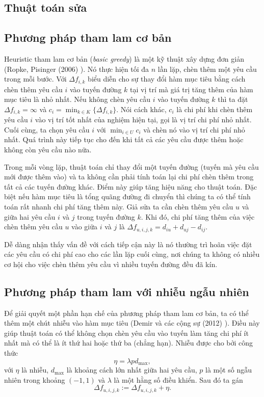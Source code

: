 \subsection{Thuật toán sửa}


\subsection{Phương pháp tham lam cơ bản}
\label{sec:basic_greedy}
Heuristic tham lam cơ bản (\textit{basic greedy}) là một kỹ thuật xây dựng đơn giản (Ropke, Pisinger (2006) \cite{ropke2006adaptive}). Nó thực hiện tối đa $n$ lần lặp, chèn thêm một yêu cầu trong mỗi bước. Với $\Delta f_{i, k}$ biểu diễn cho sự thay đổi hàm mục tiêu bằng cách chèn thêm yêu cầu $i$ vào tuyến đường $k$ tại vị trí mà giá trị tăng thêm của hàm mục tiêu là nhỏ nhất. Nếu không chèn yêu cầu $i$ vào tuyến đường $k$ thì ta đặt $\Delta f_{i, k} = \infty$ và $c_i = \min_{k \in K}\{\Delta f_{i, k}\}$. Nói cách khác, $c_i$ là chi phí khi chèn thêm yêu cầu $i$ vào vị trí tốt nhất của nghiệm hiện tại, gọi là vị trí chi phí nhỏ nhất. Cuối cùng, ta chọn yêu cầu $i$ với $\min_{i \in U} c_i$ và chèn nó vào vị trí chi phí nhỏ nhất. Quá trình này tiếp tục cho đến khi tất cả các yêu cầu được thêm hoặc không còn yêu cầu nào nữa.

Trong mỗi vòng lặp, thuật toán chỉ thay đổi một tuyến đường (tuyến mà yêu cầu mới được thêm vào) và ta không cần phải tính toán lại chi phí chèn thêm trong tất cả các tuyến đường khác. Điểm này giúp tăng hiệu năng cho thuật toán. Đặc biệt nếu hàm mục tiêu là tổng quãng đường đi chuyển thì chúng ta có thể tính toán rất nhanh chi phí tăng thêm này. Giả sửa ta cần chèn thêm yêu cầu $u$ và giữa hai yêu cầu $i$ và $j$ trong tuyến đường $k$. Khi đó, chi phí tăng thêm của việc chèn thêm yêu cầu $u$ vào giữa $i$ và $j$ là $\Delta f_{u, i, j, k} = d_{iu} + d_{uj} - d_{ij}$.

Dễ dàng nhận thấy vấn đề với cách tiếp cận này là nó thường trì hoãn việc đặt các yêu cầu có chi phí cao cho các lần lặp cuối cùng, nơi chúng ta không có nhiều cơ hội cho việc chèn thêm yêu cầu vì nhiều tuyến đường đều đã kín. 

\subsection{Phương pháp tham lam với nhiễu ngẫu nhiên}

Để giải quyết một phần hạn chế của phương pháp tham lam cơ bản, ta có thể thêm một chút nhiễu vào hàm mục tiêu (Demir và các cộng sự (2012) \cite{Demir2012}). Điều này giúp thuật toán có thể không chọn chèn yêu cầu vào tuyến làm tăng chi phí ít nhất mà có thể là ít thứ hai hoặc thứ ba (chẳng hạn). Nhiễu được cho bởi công thức
\begin{equation}
  \eta = \lambda p d_{\text{max}},
\end{equation}
với $\eta$ là nhiễu, $d_{\text{max}}$ là khoảng cách lớn nhất giữa hai yêu cầu, $p$ là một số ngẫu nhiên trong khoảng $(-1,1)$ và $\lambda$ là một hằng số điều khiển. Sau đó ta gán
\begin{equation}
  \Delta f_{u, i, j, k} := \Delta f_{u, i, j, k} + \eta.
\end{equation}

